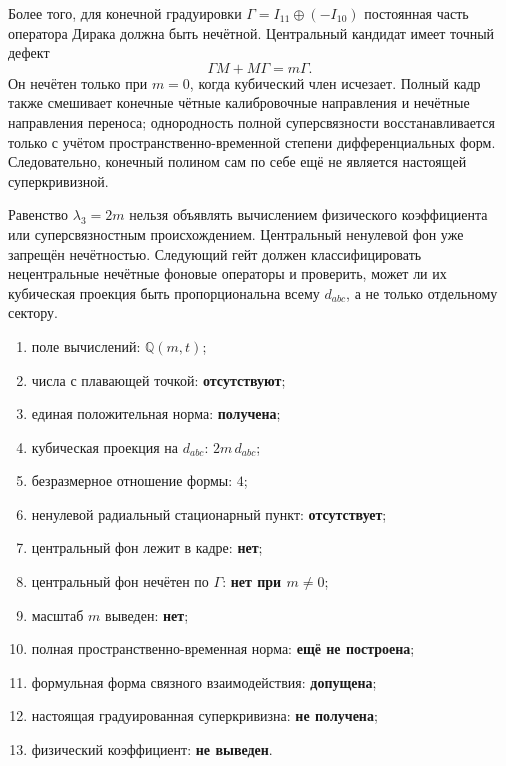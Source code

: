 Более того, для конечной градуировки
$\Gamma=I_{11}\oplus(-I_{10})$ постоянная часть оператора Дирака должна
быть нечётной. Центральный кандидат имеет точный дефект
\begin{equation}
 \Gamma M+M\Gamma=m\Gamma.
 \label{eq:v8-baryon-central-background-parity-defect}
\end{equation}
Он нечётен только при $m=0$, когда кубический член исчезает. Полный кадр
также смешивает конечные чётные калибровочные направления и нечётные
направления переноса; однородность полной суперсвязности восстанавливается
только с учётом пространственно-временной степени дифференциальных форм.
Следовательно, конечный полином сам по себе ещё не является настоящей
суперкривизной.

\begin{nogocriterion}
Равенство $\lambda_3=2m$ нельзя объявлять вычислением физического
коэффициента или суперсвязностным происхождением. Центральный ненулевой фон
уже запрещён нечётностью. Следующий гейт должен классифицировать
нецентральные нечётные фоновые операторы и проверить, может ли их кубическая
проекция быть пропорциональна всему $d_{abc}$, а не только отдельному
сектору.
\end{nogocriterion}

\begin{protocol}
\begin{enumerate}
 \item поле вычислений: \textbf{$\mathbb Q(m,t)$};
 \item числа с плавающей точкой: \textbf{отсутствуют};
 \item единая положительная норма: \textbf{получена};
 \item кубическая проекция на $d_{abc}$: \textbf{$2m\,d_{abc}$};
 \item безразмерное отношение формы: \textbf{$4$};
 \item ненулевой радиальный стационарный пункт: \textbf{отсутствует};
 \item центральный фон лежит в кадре: \textbf{нет};
 \item центральный фон нечётен по $\Gamma$: \textbf{нет при $m\ne0$};
 \item масштаб $m$ выведен: \textbf{нет};
 \item полная пространственно-временная норма: \textbf{ещё не построена};
 \item формульная форма связного взаимодействия: \textbf{допущена};
 \item настоящая градуированная суперкривизна: \textbf{не получена};
 \item физический коэффициент: \textbf{не выведен}.
\end{enumerate}
\end{protocol}

